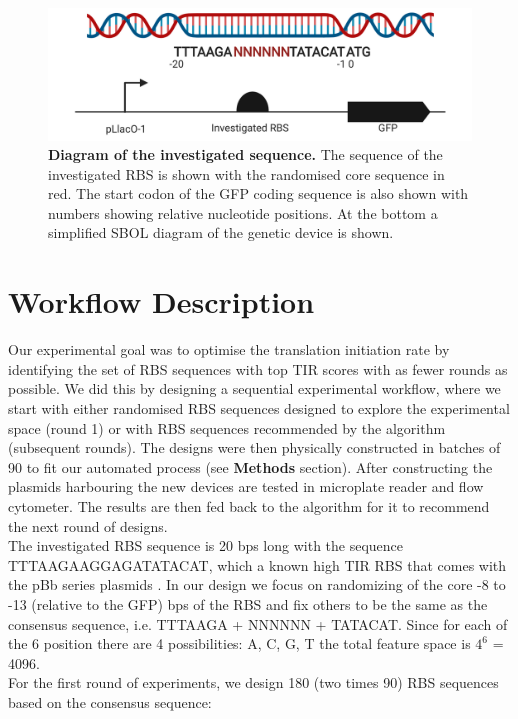 \documentclass{article}
\begin{document}
\begin{figure}[t]
    \centering
    \includegraphics[scale=0.6]{plots/RBS_anatomy.pdf}
    \caption{\textbf{Diagram of the investigated sequence.} The sequence of the investigated RBS is shown with the randomised core sequence in red. The start codon of the GFP coding sequence is also shown with numbers showing relative nucleotide positions. At the bottom a simplified SBOL diagram of the genetic device is shown.}
    \label{fig: Anatomy of the randomized sequence.}
\end{figure}



\section{Workflow Description}

Our experimental goal was to optimise the translation initiation rate by identifying the set of RBS sequences with top TIR scores with as fewer rounds as possible. We did this by designing a sequential experimental workflow, where we start with either randomised RBS sequences designed to explore the experimental space (round 1) or with RBS sequences recommended by the algorithm (subsequent rounds). The designs were then physically constructed in batches of 90 to fit our automated process (see \textbf{Methods} section). After constructing the plasmids harbouring the new devices are tested in microplate reader and flow cytometer. The results are then fed back to the algorithm for it to recommend the next round of designs.\\
The investigated RBS sequence is 20 bps long with the sequence TTTAAGAAGGAGATATACAT, which a known high TIR RBS that comes with the pBb series plasmids \cite{Lee2011}. In our design we focus on randomizing of the core -8 to -13 (relative to the GFP) bps of the RBS and fix others to be the same as the consensus sequence, i.e. TTTAAGA + NNNNNN + TATACAT. Since for each of the 6 position there are 4 possibilities: A, C, G, T the total feature space is $4^6$ = 4096.\\
For the first round of experiments, we design 180 (two times 90) RBS sequences based on the consensus sequence: 
\end{document}
